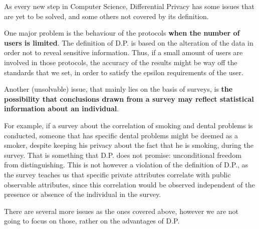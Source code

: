 As every new step in Computer Science, Differential Privacy has some issues that are yet to be solved, and some others not covered by its definition. 

One major problem is the behaviour of the protocols \textbf{when the number of users is limited}. The definition of D.P. is based on the alteration of the data in order not to reveal sensitive information. Thus, if a small amount of users are involved in those protocols, the accuracy of the results might be way off the standards that we set, in order to satisfy the epsilon requirements of the user.

Another (unsolvable) issue, that mainly lies on the basis of surveys, is  \textbf{the possibility that conclusions drawn from a survey may reflect statistical information about an individual}.

For example, if a survey about the correlation of smoking and dental problems is conducted, someone that has specific dental problems might be deemed as a smoker, despite keeping his privacy about the fact that he is smoking, during the survey. That is something that D.P. does not promise: unconditional freedom from distinguishing. This is not however a violation of the definition of D.P., as the survey teaches us that specific private attributes correlate with public observable attributes, since this correlation would be observed independent of the presence or absence of the individual in the survey.

There are several more issues as the ones covered above, however we are not going to focus on those, rather on the advantages of D.P.